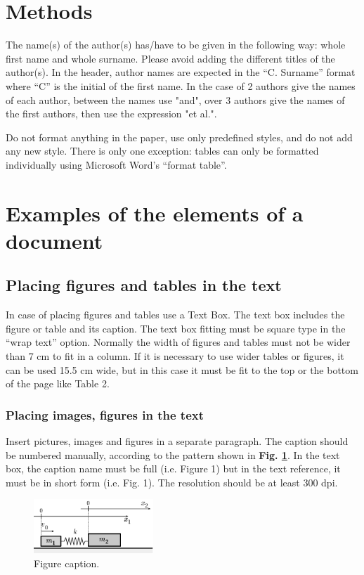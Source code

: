 \documentclass[10pt,a4paper,twocolumns]{article}
\begin{document}
\section{Methods}

The name(s) of the author(s) has/have to be given in the following way: whole first name and whole surname. Please avoid adding the different titles of the author(s). In the header, author names are expected in the ``C. Surname'' format where ``C'' is the initial of the first name. In the case of 2 authors give the names of each author, between the names use "and", over 3 authors give the names of the first authors, then use the expression "et al.".

Do not format anything in the paper, use only predefined styles, and do not add any new style. There is only one exception: tables can only be formatted individually using Microsoft Word’s “format table”.

\section{Examples of the elements of a document}

\subsection{Placing figures and tables in the text}

In case of placing figures and tables use a Text Box. The text box includes the figure or table and its caption. The text box fitting must be square type in the “wrap text” option. Normally the width of figures and tables must not be wider than 7 cm to fit in a column. If it is necessary to use wider tables or figures, it can be used 15.5 cm wide, but in this case it must be fit to the top or the bottom of the page like Table 2.

\subsubsection{Placing images, figures in the text}

Insert pictures, images and figures in a separate paragraph. The caption should be numbered manually, according to the pattern shown in
\textbf{Fig. \ref{fig:figure1label}}. In the text box, the caption name must be full (i.e. Figure 1) but in the text reference, it must be in short form (i.e. Fig. 1). The resolution should be at least $300$ dpi.

\begin{figure}[htbp]
\begin{center}
\includegraphics[width=0.4\textwidth]{fig/slbp-bodies.png}
\end{center}
\caption{Figure caption.}
\label{fig:figure1label}
\end{figure}
\end{document}
